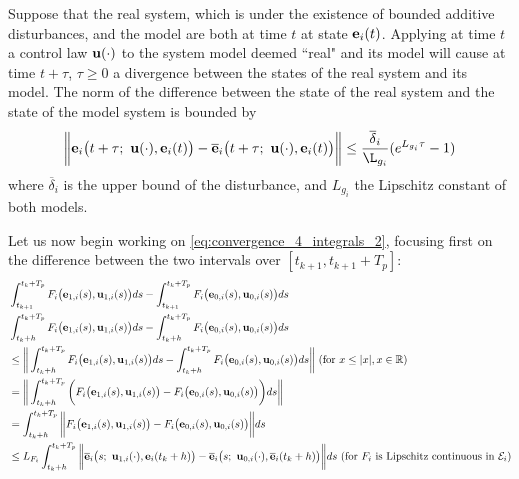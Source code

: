 \begin{bw_box}
  \begin{lemma}
    Suppose that the real system, which is under the existence of bounded
    additive disturbances, and the model are both at time $t$ at state
    $\bm{\mathbf{e}}_i(t)$. Applying at time $t$ a control law $\bm{\mathbf{u}}(\cdot)$
    to the system model deemed ``real" and its model will cause at time $t + \tau$,
    $\tau \geq 0$ a divergence between the states of the real system and its
    model. The norm of the difference between the state of the real system
    and the state of the model system is bounded by
    \begin{align}
      \bigg\| \vect{e}_i\big(t + \tau;\ \vect{u}(\cdot), \vect{e}_i(t)\big) -
        \overline{\vect{e}}_i\big(t + \tau;\ \vect{u}(\cdot), \vect{e}_i(t)\big) \bigg\|
        \leq \dfrac{\overline{\delta}_i}{\L_{g_i}} (e^{L_{g_i} \tau} - 1)
    \end{align}
    where $\overline{\delta}_i$ is the upper bound of the disturbance,
    and $L_{g_i}$ the Lipschitz constant of both models.
    \label{lemma:diff_state_from_same_conditions}
  \end{lemma}
\end{bw_box}
Let us now begin working on \eqref{eq:convergence_4_integrals_2}, focusing
first on the difference between the two intervals over $[t_{k+1}, t_{k+1} + T_p]$:
\begin{align}
  &\int_{t_{k+1}}^{t_k + T_p} F_i \big(\bm{\mathbf{e}}_{1,i}(s), \bm{\mathbf{u}}_{1,i} (s)\big) d s
    - \int_{t_{k+1}}^{t_k + T_p} F_i \big(\bm{\mathbf{e}}_{0,i}(s), \bm{\mathbf{u}}_{0,i} (s)\big) d s \\
  &\int_{t_k+h}^{t_k + T_p} F_i \big(\bm{\mathbf{e}}_{1,i}(s), \bm{\mathbf{u}}_{1,i} (s)\big) d s
    - \int_{t_k+h}^{t_k + T_p} F_i \big(\bm{\mathbf{e}}_{0,i}(s), \bm{\mathbf{u}}_{0,i} (s)\big) d s \\
  & \leq \bigg\| \int_{t_k+h}^{t_k + T_p} F_i \big(\bm{\mathbf{e}}_{1,i}(s), \bm{\mathbf{u}}_{1,i} (s)\big) d s
    - \int_{t_k+h}^{t_k + T_p} F_i \big(\bm{\mathbf{e}}_{0,i}(s), \bm{\mathbf{u}}_{0,i} (s)\big) d s \bigg\|
    \text{ (for } x \leq |x|, x \in \mathbb{R} \text{)}\\
  & = \bigg\| \int_{t_k+h}^{t_k + T_p} \bigg( F_i \big(\bm{\mathbf{e}}_{1,i}(s), \bm{\mathbf{u}}_{1,i} (s)\big)
    -  F_i \big(\bm{\mathbf{e}}_{0,i}(s), \bm{\mathbf{u}}_{0,i} (s)\big) \bigg) d s \bigg\| \\
  & = \int_{t_k+h}^{t_k + T_p} \bigg\| F_i \big(\bm{\mathbf{e}}_{1,i}(s), \bm{\mathbf{u}}_{1,i} (s)\big)
    -  F_i \big(\bm{\mathbf{e}}_{0,i}(s), \bm{\mathbf{u}}_{0,i} (s)\big) \bigg\| d s \\
  & \leq L_{F_i}\int_{t_k+h}^{t_k + T_p} \bigg\| \overline{\bm{\mathbf{e}}}_i\big(s;\ \bm{\mathbf{u}}_{1,i} (\cdot), \bm{\mathbf{e}}_i(t_k + h) \big)
    -  \overline{\bm{\mathbf{e}}}_i\big(s;\ \bm{\mathbf{u}}_{0,i} (\cdot), \overline{\bm{\mathbf{e}}}_i(t_k + h)\big) \bigg\| d s
    \text{ (for } F_i \text{ is Lipschitz continuous in } \mathcal{E}_i \text{)} \label{eq:integrals_over_same_u_LV}
\end{align}


